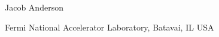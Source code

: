 \begin{center}

{Jacob Anderson}

Fermi National Accelerator Laboratory, Batavai, IL USA\\

\end{center}
